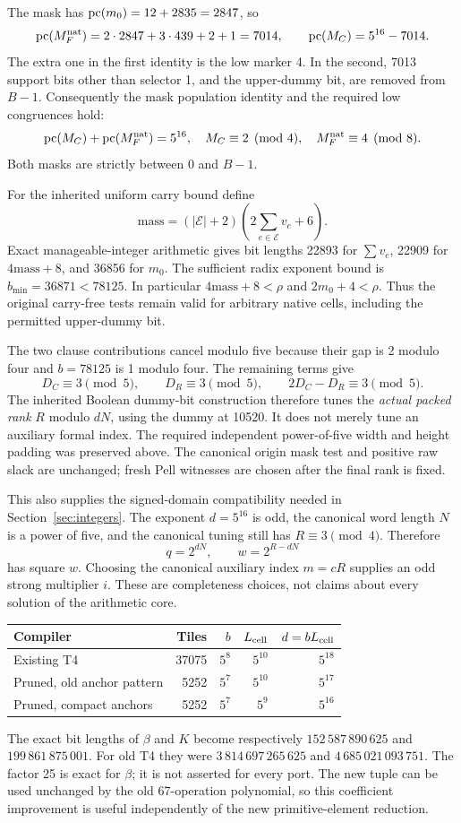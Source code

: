 The mask has $\operatorname{pc}(m_0)=12+2835=2847$, so
\[
\operatorname{pc}(M_F^{\rm nat})=2\cdot2847+3\cdot439+2+1=7014,
\qquad\operatorname{pc}(M_C)=5^{16}-7014.
\]
The extra one in the first identity is the low marker 4.  In the second,
7013 support bits other than selector 1, and the upper-dummy bit, are
removed from $B-1$.  Consequently the mask population identity and
the required low congruences hold:
\[
\operatorname{pc}(M_C)+\operatorname{pc}(M_F^{\rm nat})=5^{16},\quad
M_C\equiv2\pmod4,\quad M_F^{\rm nat}\equiv4\pmod8.
\]
Both masks are strictly between 0 and $B-1$.

For the inherited uniform carry bound define
\[
\mathrm{mass}=(|\mathcal E|+2)\left(2\sum_{e\in\mathcal E}v_e+6\right).
\]
Exact manageable-integer arithmetic gives bit lengths 22893 for
$\sum v_e$, 22909 for $4\mathrm{mass}+8$, and 36856 for $m_0$.
The sufficient radix exponent bound is $b_{\min}=36871<78125$.
In particular $4\mathrm{mass}+8<\rho$ and $2m_0+4<\rho$.
Thus the original carry-free tests remain valid for arbitrary native
cells, including the permitted upper-dummy bit.

The two clause contributions cancel modulo five because their gap
is 2 modulo four and $b=78125$ is 1 modulo four.  The remaining terms
give
\[
D_C\equiv3\pmod5,\qquad D_R\equiv3\pmod5,\qquad
2D_C-D_R\equiv3\pmod5.
\]
The inherited Boolean dummy-bit construction therefore tunes the
\emph{actual packed rank} $R$ modulo $dN$, using the dummy at 10520.
It does not merely tune an auxiliary formal index.  The required
independent power-of-five width and height padding was preserved above.
The canonical origin mask test and positive raw slack are unchanged;
fresh Pell witnesses are chosen after the final rank is fixed.

This also supplies the signed-domain compatibility needed in
Section~\ref{sec:integers}.  The exponent $d=5^{16}$ is odd, the canonical
word length $N$ is a power of five, and the canonical tuning still has
$R\equiv3\pmod4$.  Therefore
\[
q=2^{dN},\qquad w=2^{R-dN}
\]
has square $w$.  Choosing the canonical auxiliary index $m=cR$ supplies
an odd strong multiplier $i$.  These are completeness choices, not
claims about every solution of the arithmetic core.

\begin{center}\small
\begin{tabular}{lrrrr}
\toprule
Compiler & Tiles & $b$ & $L_{\rm cell}$ & $d=bL_{\rm cell}$\\
\midrule
Existing T4 &37075&$5^8$&$5^{10}$&$5^{18}$\\
Pruned, old anchor pattern &5252&$5^7$&$5^{10}$&$5^{17}$\\
Pruned, compact anchors &5252&$5^7$&$5^9$&$5^{16}$\\
\bottomrule
\end{tabular}
\end{center}
The exact bit lengths of $\beta$ and $K$ become respectively
$152\,587\,890\,625$ and $199\,861\,875\,001$.
For old T4 they were $3\,814\,697\,265\,625$ and
$4\,685\,021\,093\,751$.
The factor 25 is exact for $\beta$; it is not asserted for every port.
The new tuple can be used unchanged by the old 67-operation polynomial,
so this coefficient improvement is useful independently of the new
primitive-element reduction.
